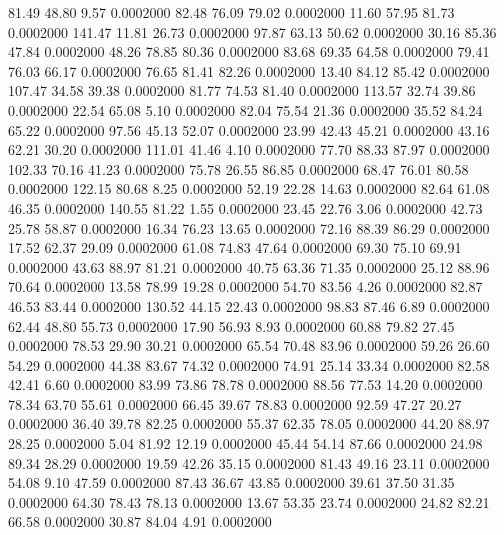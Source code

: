   81.49   48.80    9.57   0.0002000
  82.48   76.09   79.02   0.0002000
  11.60   57.95   81.73   0.0002000
 141.47   11.81   26.73   0.0002000
  97.87   63.13   50.62   0.0002000
  30.16   85.36   47.84   0.0002000
  48.26   78.85   80.36   0.0002000
  83.68   69.35   64.58   0.0002000
  79.41   76.03   66.17   0.0002000
  76.65   81.41   82.26   0.0002000
  13.40   84.12   85.42   0.0002000
 107.47   34.58   39.38   0.0002000
  81.77   74.53   81.40   0.0002000
 113.57   32.74   39.86   0.0002000
  22.54   65.08    5.10   0.0002000
  82.04   75.54   21.36   0.0002000
  35.52   84.24   65.22   0.0002000
  97.56   45.13   52.07   0.0002000
  23.99   42.43   45.21   0.0002000
  43.16   62.21   30.20   0.0002000
 111.01   41.46    4.10   0.0002000
  77.70   88.33   87.97   0.0002000
 102.33   70.16   41.23   0.0002000
  75.78   26.55   86.85   0.0002000
  68.47   76.01   80.58   0.0002000
 122.15   80.68    8.25   0.0002000
  52.19   22.28   14.63   0.0002000
  82.64   61.08   46.35   0.0002000
 140.55   81.22    1.55   0.0002000
  23.45   22.76    3.06   0.0002000
  42.73   25.78   58.87   0.0002000
  16.34   76.23   13.65   0.0002000
  72.16   88.39   86.29   0.0002000
  17.52   62.37   29.09   0.0002000
  61.08   74.83   47.64   0.0002000
  69.30   75.10   69.91   0.0002000
  43.63   88.97   81.21   0.0002000
  40.75   63.36   71.35   0.0002000
  25.12   88.96   70.64   0.0002000
  13.58   78.99   19.28   0.0002000
  54.70   83.56    4.26   0.0002000
  82.87   46.53   83.44   0.0002000
 130.52   44.15   22.43   0.0002000
  98.83   87.46    6.89   0.0002000
  62.44   48.80   55.73   0.0002000
  17.90   56.93    8.93   0.0002000
  60.88   79.82   27.45   0.0002000
  78.53   29.90   30.21   0.0002000
  65.54   70.48   83.96   0.0002000
  59.26   26.60   54.29   0.0002000
  44.38   83.67   74.32   0.0002000
  74.91   25.14   33.34   0.0002000
  82.58   42.41    6.60   0.0002000
  83.99   73.86   78.78   0.0002000
  88.56   77.53   14.20   0.0002000
  78.34   63.70   55.61   0.0002000
  66.45   39.67   78.83   0.0002000
  92.59   47.27   20.27   0.0002000
  36.40   39.78   82.25   0.0002000
  55.37   62.35   78.05   0.0002000
  44.20   88.97   28.25   0.0002000
   5.04   81.92   12.19   0.0002000
  45.44   54.14   87.66   0.0002000
  24.98   89.34   28.29   0.0002000
  19.59   42.26   35.15   0.0002000
  81.43   49.16   23.11   0.0002000
  54.08    9.10   47.59   0.0002000
  87.43   36.67   43.85   0.0002000
  39.61   37.50   31.35   0.0002000
  64.30   78.43   78.13   0.0002000
  13.67   53.35   23.74   0.0002000
  24.82   82.21   66.58   0.0002000
  30.87   84.04    4.91   0.0002000
